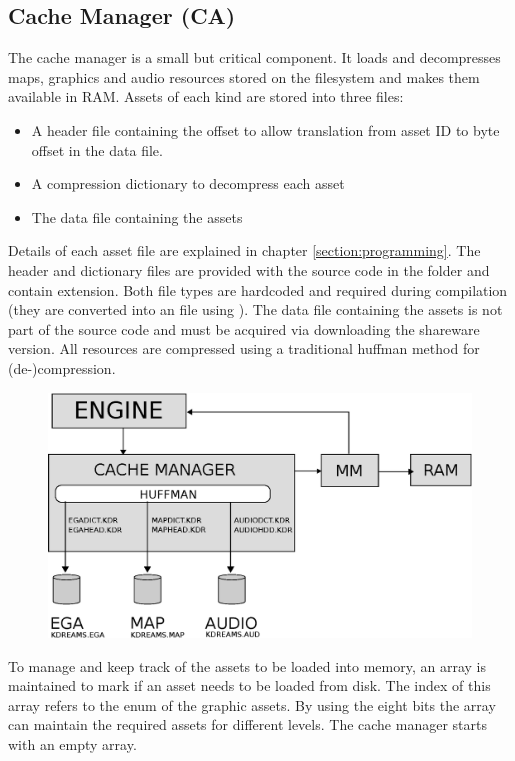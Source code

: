 \documentclass[book.tex]{subfiles}
\begin{document}
\subsection{Cache Manager (CA)}
The cache manager is a small but critical component. It loads and decompresses maps, graphics and audio resources stored on the filesystem and makes them available in RAM. Assets of each kind are stored into three files: 
\begin{itemize}
	\item A header file containing the offset to allow translation from asset ID to byte offset in the data file.
	\item A compression dictionary to decompress each asset
	\item The data file containing the assets
\end{itemize}
 \par
 
Details of each asset file are explained in chapter \ref{section:programming}. The header and dictionary files are provided with the source code in the  folder and contain  extension. Both file types are hardcoded and required during compilation (they are converted into an  file using ). The data file containing the assets is not part of the source code and must be acquired via downloading the shareware version.
 All resources are compressed using a traditional huffman method for (de-)compression. \\
 \par
\begin{figure}[H]
\centering
 \includegraphics[width=\textwidth]{imgs/drawings/cache_manager_architecture.eps}
 \end{figure}
\pagebreak


To manage and keep track of the assets to be loaded into memory, an array  is maintained to mark if an asset needs to be loaded from disk. The index of this array refers to the enum of the graphic assets. By using the eight bits the array can maintain the required assets for different levels.
The cache manager starts with an empty  array.\\
\par
\end{document}
